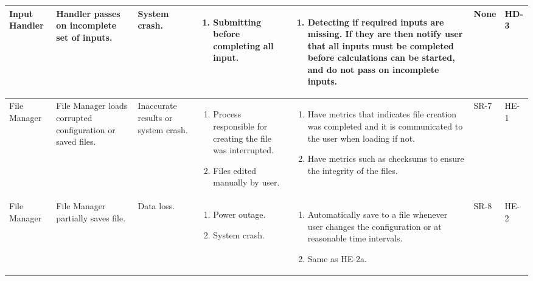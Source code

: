 \documentclass{article}
\begin{document}
\begin{landscape}
\begin{longtable}{|p{} | p{} | p{} | p{} | p{} | p{} | p{}|}
  \hline

  Input Handler & Handler passes on incomplete set of inputs. & System crash. &
  \begin{enumerate}[leftmargin=*, label={\alph*.}, itemsep=1pt, topsep=0pt, partopsep=0pt] 
    \item Submitting before completing all input.
  \end{enumerate} &
  \begin{enumerate}[leftmargin=*, label={\alph*.}, itemsep=1pt, topsep=0pt, partopsep=0pt] 
    \item Detecting if required inputs are missing. If they are then notify user that all inputs must be completed before calculations can be started, and do not pass on incomplete inputs.
  \end{enumerate} &
  None & HD-3 \\

  \hline

  File Manager & File Manager loads corrupted configuration or saved files. &
  Inaccurate results or system crash. &
  \begin{enumerate}[leftmargin=*, label={\alph*.}, itemsep=1pt, topsep=0pt, partopsep=0pt] 
    \item Process responsible for creating the file was interrupted.
    \item Files edited manually by user.
  \end{enumerate} &
  \begin{enumerate}[leftmargin=*, label={\alph*.}, itemsep=1pt, topsep=0pt, partopsep=0pt] 
    \item Have metrics that indicates file creation was completed and it is communicated to the user when loading if 
    not.
    \item Have metrics such as checksums to ensure the integrity of the files.  
  \end{enumerate} &
  SR-7 & HE-1 \\

  \hline

  File Manager & File Manager partially saves file. & Data loss. &
  \begin{enumerate}[leftmargin=*, label={\alph*.}, itemsep=1pt, topsep=0pt, partopsep=0pt] 
    \item Power outage.
    \item System crash.     
  \end{enumerate} &
  \begin{enumerate}[leftmargin=*, label={\alph*.}, itemsep=1pt, topsep=0pt, partopsep=0pt] 
    \item Automatically save to a file whenever user changes the configuration or at reasonable time intervals.
    \item Same as HE-2a.
  \end{enumerate} & 
  SR-8 & HE-2 \\
  \hline
\end{longtable}
\end{landscape}
\end{document}
